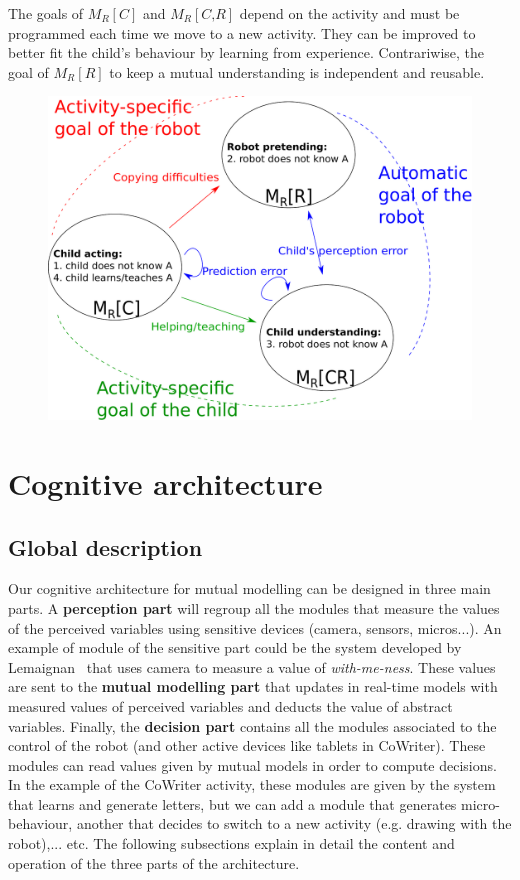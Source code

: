 \documentclass[10pt,a4paper]{article}
\begin{document}
The goals of $ M_R\left[\textit{C}\right]$ and $ M_R\left[\textit{C,R}\right]$ depend on the activity and must be programmed each time we move to a new activity. They can be improved to better fit the child's behaviour by learning from experience. Contrariwise, the goal of $ M_R\left[\textit{R}\right]$ to keep a mutual understanding is independent and reusable. 

\begin{figure}[!]
\centering
\includegraphics[width=0.6\columnwidth]{mutual_behaviour}
\caption{\small\textbf{}  }
\label{mm}
\end{figure} 

\section{Cognitive architecture}\label{arch}

\subsection{Global description}

Our cognitive architecture for mutual modelling can be designed in three main parts. A \textbf{perception part} will regroup all the modules that measure the values of the perceived variables using sensitive devices (camera, sensors, micros...). An example of module of the sensitive part could be the system developed by Lemaignan~\cite{lemaignan2016realtime} that uses camera to measure a value of \textit{with-me-ness}. These values are sent to the \textbf{mutual modelling part} that updates in real-time models with measured values of perceived variables and deducts the value of abstract variables. Finally, the \textbf{decision part} contains all the modules associated to the control of the robot (and other active devices like tablets in CoWriter). These modules can read values given by mutual models in order to compute decisions. In the example of the CoWriter activity, these modules are given by the system that learns and generate letters, but we can add a module that generates micro-behaviour, another that decides to switch to a new activity (e.g. drawing with the robot),... etc. The following subsections explain in detail the content and operation of the three parts of the architecture. 
\end{document}
